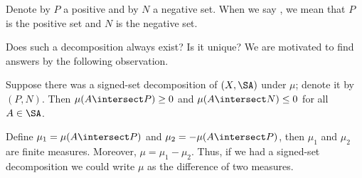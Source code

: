 
Denote by $P$ a positive
and by $N$ a negative set.
When we say ,
we mean that $P$ is
the positive set and $N$
is the negative set.


Does such a decomposition
always exist? Is it unique?
We are motivated to find
answers
by the following observation.

Suppose there was a signed-set
decomposition of $(X, \SA)$
under $\mu$; denote it by $(P, N)$.
Then
$\mu(A \intersect P) \geq 0$
and $\mu(A \intersect N) \leq 0$
for all $A \in \SA$.

Define
$\mu_1 = \mu(A \intersect P)$
and $\mu_2 = -\mu(A \intersect P)$,
then $\mu_1$ and $\mu_2$ are finite measures.
Moreover, $\mu = \mu_1 - \mu_2$.
Thus, if we had a signed-set decomposition
we could write $\mu$ as the difference
of two measures.
\strats
